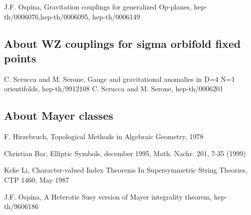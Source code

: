 \documentclass[a4paper,a4paper]{article}
\begin{document}
J.F. Ospina, Gravitation couplings for generalized Op-planes, hep-th/0006076,hep-th/0006095, hep-th/0006149

\subsection{About WZ couplings  for sigma orbifold fixed points}
\setlength{\baselineskip}{20pt}
C. Scrucca and M. Serone, Gauge and gravitational anomalies in D=4 N=1 orientifolds, hep-th/9912108
C. Scrucca and M. Serone, hep-th/0006201

\subsection{About Mayer classes}
\setlength{\baselineskip}{20pt}

F. Hirzebruch, Topological Methods in Algebraic Geometry, 1978

Christian Bar,  Elliptic Symbols, december 1995, Math. Nachr. 201, 7-35 (1999)

Keke Li,  Character-valued Index Theorems In Supersymmetric String Theories,
CTP  1460, May 1987

J.F. Ospina, A Heterotic Susy version of  Mayer integrality theorem, hep-th/9606186
   
\end{document}
